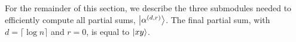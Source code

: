 \documentclass[reprint,amsmath,amssymb,aps,pra]{revtex4-2}
\begin{document}


For the remainder of this section, we describe the three submodules needed to efficiently compute all partial sums, $\ket{\alpha^{(d,r)}}$. 
The final partial sum, with $d=\lceil\log n\rceil$ and $r = 0$, is equal to $\ket{xy}$.


%



\end{document}
